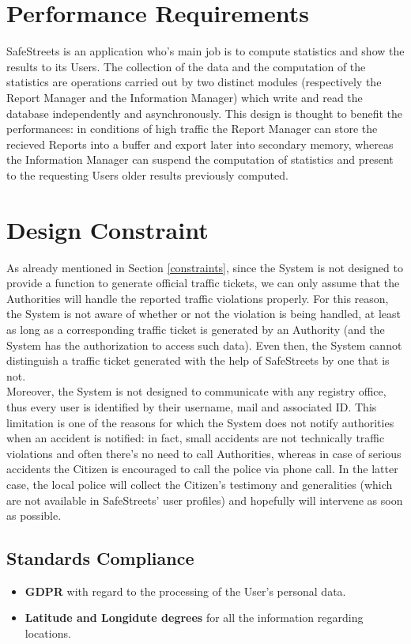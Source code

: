 \documentclass{report}
\begin{document}
\newpage

\section{Performance Requirements}
SafeStreets is an application who's main job is to compute statistics and show the results to its Users. The collection of the data and the computation of the statistics are operations carried out by two distinct modules (respectively the Report Manager and the Information Manager) which write and read the database independently and asynchronously. This design is thought to benefit the performances: in conditions of high traffic the Report Manager can store the recieved Reports into a buffer and export later into secondary memory, whereas the Information Manager can suspend the computation of statistics and present to the requesting Users older results previously computed.
\section{Design Constraint}
As already mentioned in Section \ref{constraints}, since the System is not designed to provide a function to generate official traffic tickets, we can only assume that the Authorities will handle the reported traffic violations properly. For this reason, the System is not aware of whether or not the violation is being handled, at least as long as a corresponding traffic ticket is generated by an Authority (and the System has the authorization to access such data). Even then, the System cannot distinguish a traffic ticket generated with the help of SafeStreets by one that is not.
\\
Moreover, the System is not designed to communicate with any registry office, thus every user is identified by their username, mail and associated ID. This limitation is one of the reasons for which the System does not notify authorities when an accident is notified: in fact, small accidents are not technically traffic violations and often there's no need to call Authorities, whereas in case of serious accidents the Citizen is encouraged to call the police via phone call. In the latter case, the local police will collect the Citizen's testimony and generalities (which are not available in SafeStreets' user profiles) and hopefully will intervene as soon as possible. 
\subsection{Standards Compliance}
\begin{itemize}
	\item \textbf{GDPR} with regard to the processing of the User's personal data.
	\item \textbf{Latitude and Longidute degrees} for all the information regarding locations.
\end{itemize}
\end{document}
